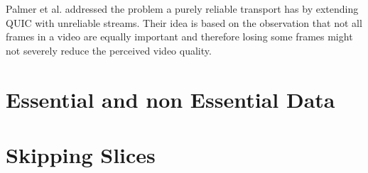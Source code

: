Palmer et al. addressed the problem a purely reliable transport has by extending QUIC
with unreliable streams. Their idea is based on the observation that not all frames in a
video are equally important and therefore losing some frames might not severely reduce the
perceived video quality.


\section{Essential and non Essential Data}

\section{Skipping Slices}
